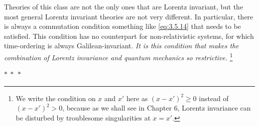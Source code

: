 Theories of this class are not the only ones that are Lorentz invariant, but the most general
Lorentz invariant theories are not very different. In particular, there is always a commutation
condition something like \eqref{eq:3.5.14} that needs to be satisfied. This condition has no counterpart
for non-relativistic systems, for which time-ordering is always Galilean-invariant.
\emph{It is this condition that makes the combination of Lorentz invariance and quantum mechanics
so restrictive.}
\footnote{We write the condition on $x$ and $x'$ here as $(x-x')^2\geq0$ instead of
$(x-x')^2>0$, because as we shall see in Chapter 6, Lorentz invariance can be disturbed by
troublesome singularities at $x=x'$.}

\begin{center}
$*\ *\ *$
\end{center}

